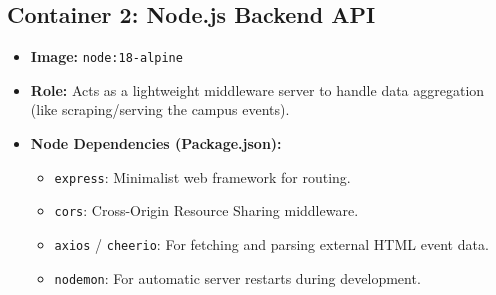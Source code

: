 \documentclass[12pt]{article}
\begin{document}
\subsection{Container 2: Node.js Backend API}
\begin{itemize}[noitemsep]
    \item \textbf{Image:} \texttt{node:18-alpine}
    \item \textbf{Role:} Acts as a lightweight middleware server to handle data aggregation (like scraping/serving the campus events). 
    \item \textbf{Node Dependencies (Package.json):}
    \begin{itemize}
        \item \texttt{express}: Minimalist web framework for routing.
        \item \texttt{cors}: Cross-Origin Resource Sharing middleware.
        \item \texttt{axios} / \texttt{cheerio}: For fetching and parsing external HTML event data.
        \item \texttt{nodemon}: For automatic server restarts during development.
    \end{itemize}
\end{itemize}
\end{document}
